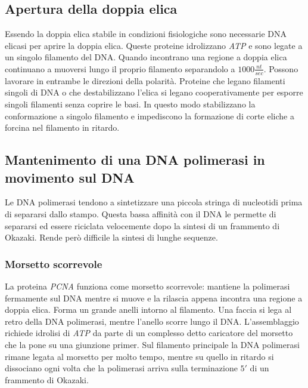 	\subsection{Apertura della doppia elica}
	Essendo la doppia elica stabile in condizioni fisiologiche sono necessarie DNA elicasi per aprire la doppia elica.
	Queste proteine idrolizzano \emph{ATP} e sono legate a un singolo filamento del DNA.
	Quando incontrano una regione a doppia elica continuano a muoversi lungo il proprio filamento separandolo a $1000\frac{nt}{sec}$.
	Possono lavorare in entrambe le direzioni della polarit\`a.
	Proteine che legano filamenti singoli di DNA o che destabilizzano l'elica si legano cooperativamente per esporre singoli filamenti senza coprire le basi.
	In questo modo stabilizzano la conformazione a singolo filamento e impediscono la formazione di corte eliche a forcina nel filamento in ritardo.

	\subsection{Mantenimento di una DNA polimerasi in movimento sul DNA}
	Le DNA polimerasi tendono a sintetizzare una piccola stringa di nucleotidi prima di separarsi dallo stampo.
	Questa bassa affinit\`a con il DNA le permette di separarsi ed essere riciclata velocemente dopo la sintesi di un frammento di Okazaki.
	Rende per\`o difficile la sintesi di lunghe sequenze.

		\subsubsection{Morsetto scorrevole}
		La proteina \emph{PCNA} funziona come morsetto scorrevole: mantiene la polimerasi fermamente sul DNA mentre si muove e la rilascia appena incontra una regione a doppia elica.
		Forma un grande anelli intorno al filamento.
		Una faccia si lega al retro della DNA polimerasi, mentre l'anello scorre lungo il DNA.
		L'assemblaggio richiede idrolisi di \emph{ATP} da parte di un complesso detto caricatore del morsetto che la pone su una giunzione primer.
		Sul filamento principale la DNA polimerasi rimane legata al morsetto per molto tempo, mentre su quello in ritardo si dissociano ogni volta che la polimerasi arriva sulla terminazione $5'$ di un frammento di Okazaki.

